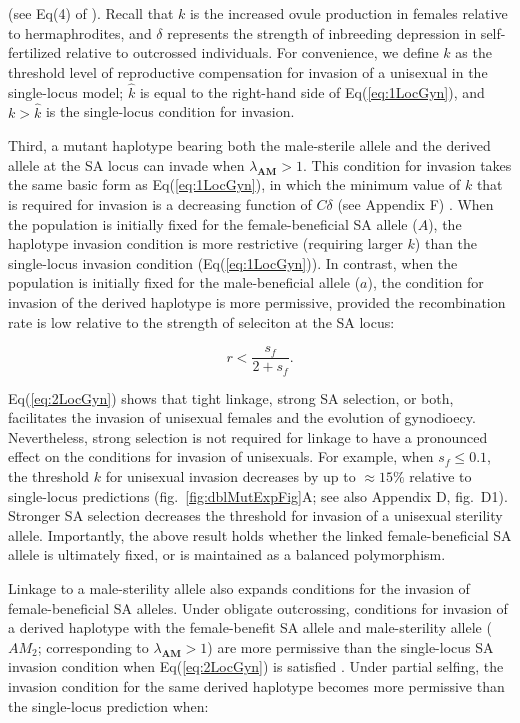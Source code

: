 \documentclass{article}
\newcommand\hl[1]{%
  \bgroup
  \hskip0pt\color{blue!80!black}%
  #1%
  \egroup
}
\begin{document}
\noindent (see Eq(4) of \citealt{Charlesworth1978a}). Recall that $k$ is the increased ovule production in females relative to hermaphrodites, and $\delta$ represents the strength of inbreeding depression in self-fertilized relative to outcrossed individuals. For convenience, we define $\hat{k}$ as the threshold level of reproductive compensation for invasion of a unisexual in the single-locus model; $\hat{k}$ is equal to the right-hand side of Eq(\ref{eq:1LocGyn}), and $k > \hat{k}$ is the single-locus condition for invasion.

Third, a mutant haplotype bearing both the male-sterile allele and the derived allele at the SA locus can invade when $\lambda_{\mathbf{AM}} > 1$. This condition for invasion takes the same basic form as Eq(\ref{eq:1LocGyn}), in which the minimum value of $k$ that is required for invasion is a decreasing function of $C \delta$ \hl{(see Appendix F)}. When the population is initially fixed for the female-beneficial SA allele ($A$), the haplotype invasion condition is more restrictive (requiring larger $k$) than the single-locus invasion condition (Eq(\ref{eq:1LocGyn})). In contrast, when the population is initially fixed for the male-beneficial allele ($a$), the condition for invasion of the derived haplotype is more permissive, provided the recombination rate is low relative to the strength of seleciton at the SA locus: 

\begin{equation}\label{eq:2LocGyn}
	r < \frac{s_f}{2 + s_f}.
\end{equation}

\noindent \hl{Eq(\ref{eq:2LocGyn}) shows that tight linkage, strong SA selection, or both, facilitates the invasion of unisexual females and the evolution of gynodioecy. Nevertheless, strong selection is not required for linkage to have a pronounced effect on the conditions for invasion of unisexuals. For example, when $s_f \leq 0.1$, the threshold $k$ for unisexual invasion decreases by up to $\approx 15 \%$ relative to single-locus predictions (fig.~\ref{fig:dblMutExpFig}A; see also Appendix D, fig.~D1). Stronger SA selection decreases the threshold for invasion of a unisexual sterility allele. Importantly, the above result holds whether the linked female-beneficial SA allele is ultimately fixed, or is maintained as a balanced polymorphism.}

Linkage to a male-sterility allele also expands conditions for the invasion of female-beneficial SA alleles. Under obligate outcrossing, conditions for invasion of a derived haplotype with the female-benefit SA allele and male-sterility allele ($AM_2$; corresponding to $\lambda_{\mathbf{AM}} > 1$) \hl{are more permissive than the single-locus SA invasion condition when Eq(\ref{eq:2LocGyn}) is satisfied}. Under partial selfing, the invasion condition for the same derived haplotype becomes more permissive than the single-locus prediction when:
\end{document}
